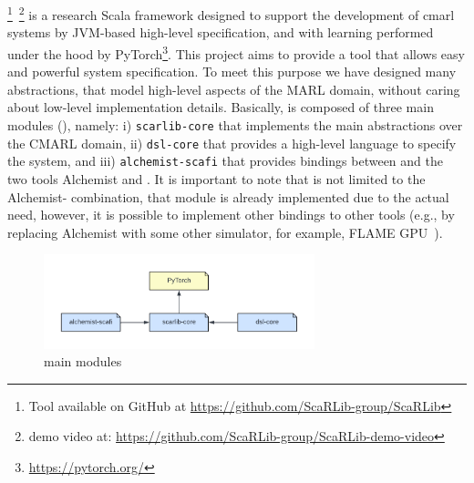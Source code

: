 \section{\scarlib{}}\label{coordination2023:contribution}

\scarlib{} \footnote{Tool available on GitHub at \url{https://github.com/ScaRLib-group/ScaRLib}}~\footnote{demo video at: \url{https://github.com/ScaRLib-group/ScaRLib-demo-video}} is a research Scala framework designed to support
the development of \ac{cmarl} systems by JVM-based high-level specification, and with learning performed under the hood by PyTorch\footnote{\url{https://pytorch.org/}}.
%
This project aims to provide a tool that allows easy and powerful system specification.
%
To meet this purpose we have designed many abstractions, that model high-level aspects of the MARL domain, 
 without caring about low-level implementation details.
Basically, \scarlib{} is composed of three main modules (), namely: 
    i) \texttt{scarlib-core} that implements the main abstractions over the CMARL domain,
    ii) \texttt{dsl-core} that provides a high-level language to specify the system, and
    iii) \texttt{alchemist-scafi} that provides bindings between \scarlib{} and the two tools Alchemist and \scafi{}.
    It is important to note that \scarlib{} is not limited to the Alchemist-\scafi{} combination, that module is 
    already implemented due to the actual need, however, it is possible to implement other bindings to other tools
    (e.g., by replacing Alchemist with some other simulator, for example, FLAME GPU~\cite{flame}).
\begin{figure}[t]
    \centering
    \includegraphics[width=0.7\textwidth]{papers/coordination2023/imgs/scarlib-modules.pdf}
    \caption{\scarlib{} main modules}
    \label{coordination2023:fig:modules}
\end{figure}

